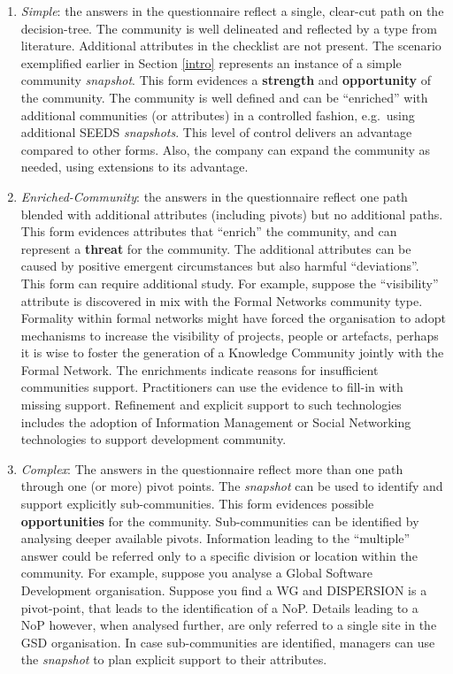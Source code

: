\begin{enumerate}
\item \emph{Simple}: the answers in the questionnaire reflect a single, clear-cut path on the decision-tree. The community is well delineated and reflected by a type from literature. Additional attributes in the checklist are not present. The scenario exemplified earlier in Section \ref{intro} represents an instance of a simple community \emph{snapshot}. This form evidences a \textbf{strength} and \textbf{opportunity} of the community. The community is well defined and can be ``enriched'' with additional communities (or attributes) in a controlled fashion, e.g.~using additional SEEDS \emph{\emph{snapshots}}. This level of control delivers an advantage compared to other forms. Also, the company can expand the community as needed, using extensions to its advantage.

\item \emph{Enriched-Community}: the answers in the questionnaire reflect one path blended with additional attributes (including pivots) but no additional paths. This form evidences attributes that ``enrich'' the community, and can represent a \textbf{threat} for the community. The additional attributes can be caused by positive emergent circumstances but also harmful ``deviations''. This form can require additional study.
For example, suppose the ``visibility'' attribute is discovered in mix with the Formal Networks community type. 
Formality within formal networks might have forced the organisation to adopt mechanisms to increase the visibility of projects, people or artefacts, perhaps it is wise to foster the generation of a Knowledge Community jointly with the Formal Network. The enrichments indicate reasons for insufficient communities support. Practitioners can use the evidence to fill-in with missing support. Refinement and explicit support to such technologies includes the adoption of Information Management or Social Networking technologies \cite{eis,eim} to support development community.

\item \emph{Complex}: The answers in the questionnaire reflect more than one path through one (or more) pivot points. The \emph{snapshot} can be used to identify and support explicitly sub-communities. This form evidences possible \textbf{opportunities} for the community. Sub-communities can be identified by analysing deeper available pivots. Information leading to the ``multiple'' answer could be referred only to a specific division or location within the community. For example, suppose you analyse a Global Software Development organisation. Suppose you find a WG and DISPERSION is a pivot-point, that leads to the identification of a NoP. Details leading to a NoP however, when analysed further, are only referred to a single site in the GSD organisation. In case sub-communities are identified, managers can use the \emph{snapshot} to plan explicit support to their attributes.


\end{enumerate}
